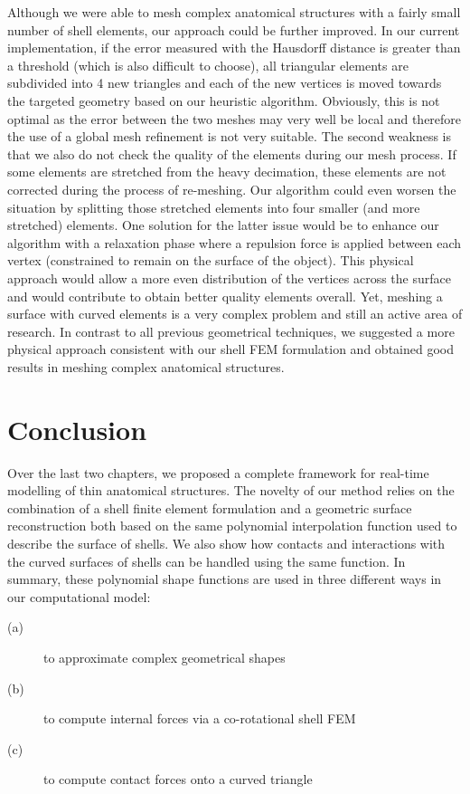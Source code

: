 Although we were able to mesh complex anatomical structures with a fairly small number of shell elements, our approach could be further improved. In our current implementation, if the error measured with the Hausdorff distance is greater than a threshold (which is also difficult to choose), all triangular elements are subdivided into 4 new triangles and each of the new vertices is moved towards the targeted geometry based on our heuristic algorithm. Obviously, this is not optimal as the error between the two meshes may very well be local and therefore the use of a global mesh refinement is not very suitable. The second weakness is that we also do not check the quality of the elements during our mesh process. If some elements are stretched from the heavy decimation, these elements are not corrected during the process of re-meshing. Our algorithm could even worsen the situation by splitting those stretched elements into four smaller (and more stretched) elements. One solution for the latter issue would be to enhance our algorithm with a relaxation phase where a repulsion force is applied between each vertex (constrained to remain on the surface of the object). This physical approach would allow a more even distribution of the vertices across the surface and would contribute to obtain better quality elements overall. Yet, meshing a surface with curved elements is a very complex problem and still an active area of research. In contrast to all previous geometrical techniques, we suggested a more physical approach consistent with our shell FEM formulation and obtained good results in meshing complex anatomical structures. 

\section{Conclusion}

Over the last two chapters, we proposed a complete framework for real-time modelling of thin anatomical structures. The novelty of our method relies on the combination of a shell finite element formulation and a geometric surface reconstruction both based on the same polynomial interpolation function used to describe the surface of shells. We also show how contacts and interactions with the curved surfaces of shells can be handled using the same function. In summary, these polynomial shape functions are used in three different ways in our computational model:
%
\begin{description}
\item[(a)] to approximate complex geometrical shapes
\item[(b)] to compute internal forces via a co-rotational shell FEM
\item[(c)] to compute contact forces onto a curved triangle
\end{description}

